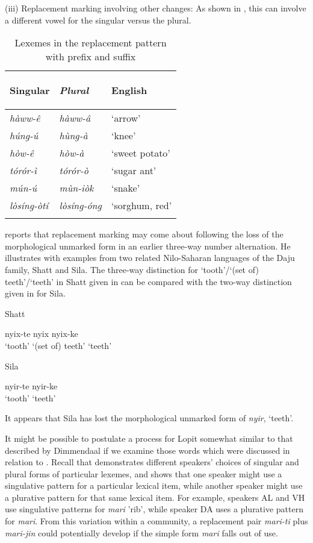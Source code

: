 \documentclass[output=paper]{langsci/langscibook}
\begin{document}
(iii) Replacement marking involving other changes: As shown in , this can involve a different vowel for the singular versus the plural.

\begin{table}

\begin{tabularx}{.66\textwidth}{>{\itshape}X>{\itshape}XX}
\lsptoprule

 \textup{Singular} & \textup{Plural} & {English}\\ \midrule
 hàww-\^{e} &  hàww-\^{a} & ‘arrow’\\
 húng-ú &  hùng-à & ‘knee’\\
 hòw-\^{e} &  hòw-à & ‘sweet potato’\\
 tórór-ì &  tórór-ò & ‘sugar ant’\\
 mún-ú &  mùn-iòk & ‘snake’\\
 lòsíng-òtí &  lòsíng-óng & ‘sorghum, red’\\
\lspbottomrule
\end{tabularx}
\caption{Lexemes in the replacement pattern with prefix and suffix}
\label{tab:moodie:16}
\end{table}

\citet[242]{Dimmendaal2000} reports that replacement marking may come about following the loss of the morphological unmarked form in an earlier three-way number alternation. He illustrates with examples from two related Nilo-Saharan languages of the Daju family, Shatt and Sila. The three-way distinction for ‘tooth’/‘(set of) teeth’/‘teeth’ in Shatt given in  can be compared with the two-way distinction given in  for Sila.

\ea\label{ex:moodie:4}
Shatt \citep[242]{Dimmendaal2000}

\gll nyix-te nyix nyix-ke \\
‘tooth’ {‘(set of) teeth’} ‘teeth’ \\
\z

\ea\label{ex:moodie:5}
Sila \citep[243]{Dimmendaal2000}

\gll nyir-te nyir-ke \\
‘tooth’ ‘teeth’ \\
\z

It appears that Sila has lost the morphological unmarked form of \textit{nyir}, ‘teeth’. 

It might be possible to postulate a process for Lopit somewhat similar to that described by Dimmendaal if we examine those words which were discussed in relation to . Recall that  demonstrates different speakers’ choices of singular and plural forms of particular lexemes, and shows that one speaker might use a singulative pattern for a particular lexical item, while another speaker might use a plurative pattern for that same lexical item. For example, speakers AL and VH use singulative patterns for \textit{mari} 'rib', while speaker DA uses a plurative pattern for \textit{mari}. From this variation within a community, a replacement pair \textit{mari-ti} plus \textit{mari-jin} could potentially develop if the simple form \textit{mari} falls out of use. 
\end{document}
